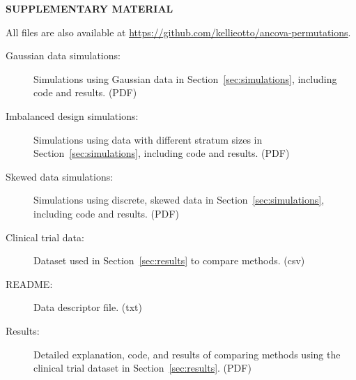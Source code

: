 \documentclass[12pt]{article}
\begin{document}
\bigskip
\begin{center}
{\large\bf SUPPLEMENTARY MATERIAL}
\end{center}
All files are also available at \url{https://github.com/kellieotto/ancova-permutations}.

\begin{description}

\item[Gaussian data simulations:] Simulations using Gaussian data in Section~\ref{sec:simulations}, including code and results. (PDF)
\item[Imbalanced design simulations:] Simulations using data with different stratum sizes in Section~\ref{sec:simulations}, including code and results. (PDF)
\item[Skewed data simulations:] Simulations using discrete, skewed data in Section~\ref{sec:simulations}, including code and results. (PDF)
\item[Clinical trial data:] Dataset used in Section~\ref{sec:results} to compare methods. (csv)
\item[README:] Data descriptor file. (txt)
\item[Results:] Detailed explanation, code, and results of comparing methods using the clinical trial dataset in Section~\ref{sec:results}. (PDF)

\end{description}




\end{document}
